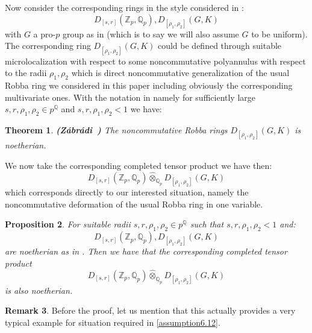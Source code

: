 \documentclass[12pt]{amsart}
\newtheorem{theorem}{Theorem}[section]
\newtheorem{proposition}[theorem]{Proposition}
\theoremstyle{definition}
\newtheorem{remark}[theorem]{Remark}
\numberwithin{equation}{section}
\begin{document}
Now consider the corresponding rings in the style considered in \cite[Proposition 4.1]{Zab1}:
\begin{displaymath}
D_{[s,r]}(\mathbb{Z}_p,\mathbb{Q}_p), D_{[\rho_1,\rho_2]}(G,K)	
\end{displaymath}
with $G$ a pro-$p$ group as in \cite[Chapter 4]{Zab1} (which is to say we will also assume $G$ to be uniform). The corresponding ring $D_{[\rho_1,\rho_2]}(G,K)$ could be defined through suitable microlocalization with respect to some noncommutative polyannulus with respect to the radii $\rho_1,\rho_2$ which is direct noncommutative generalization of the usual Robba ring we considered in this paper including obviously the corresponding multivariate ones. With the notation in \cite[Proposition 4.1]{Zab1} namely for sufficiently large $s,r,\rho_1,\rho_2\in p^\mathbb{Q}$ and $s,r,\rho_1,\rho_2<1$ we have:

\begin{theorem} \mbox{\bf{(Z\'abr\'adi \cite[Proposition 4.1]{Zab1})}}
The noncommutative Robba rings $D_{[\rho_1,\rho_2]}(G,K)$ is noetherian.	
\end{theorem}

	
We now take the corresponding completed tensor product we have then:
\begin{displaymath}
D_{[s,r]}(\mathbb{Z}_p,\mathbb{Q}_p)\widehat{\otimes}_{\mathbb{Q}_p}D_{[\rho_1,\rho_2]}(G,K)	
\end{displaymath}
which corresponds directly to our interested situation, namely the noncommutative deformation of the usual Robba ring in one variable. 


\begin{proposition}
For suitable radii $s,r,\rho_1,\rho_2\in p^\mathbb{Q}$ such that $s,r,\rho_1,\rho_2<1$ and:
\begin{displaymath}
D_{[s,r]}(\mathbb{Z}_p,\mathbb{Q}_p), D_{[\rho_1,\rho_2]}(G,K)	
\end{displaymath}
are noetherian as in \cite[Proposition 4.1]{Zab1}. Then we have that the corresponding completed tensor product 
\begin{displaymath}
D_{[s,r]}(\mathbb{Z}_p,\mathbb{Q}_p)\widehat{\otimes}_{\mathbb{Q}_p}D_{[\rho_1,\rho_2]}(G,K)	
\end{displaymath}
is also noetherian.

\end{proposition}
	
\begin{remark}
Before the proof, let us mention that this actually provides a very typical example for situation required in \cref{assumption6.12}.	
\end{remark}
\end{document}
